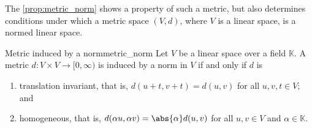 The \cref{prop:metric_norm} shows a property of such a metric, but also determines conditions under which a metric space \((V, d)\), where \(V\) is a linear space, is a normed linear space.
\begin{proposition}{Metric induced by a norm}{metric_norm}
    Let \(V\) be a linear space over a field \(\mathbb{K}\). A metric \(d : V \times V \to [0, \infty)\) is induced by a norm in \(V\) if and only if \(d\) is
    \begin{enumerate}[label=(\alph*)]
        \item translation invariant, that is, \(d(u + t, v + t) = d(u, v)\) for all \(u,v,t \in V\); and
        \item homogeneous, that is, \(d(\alpha u , \alpha v) = \abs{\alpha}d(u, v)\) for all \(u,v \in V\) and \(\alpha \in \mathbb{K}\).
    \end{enumerate}
\end{proposition}
